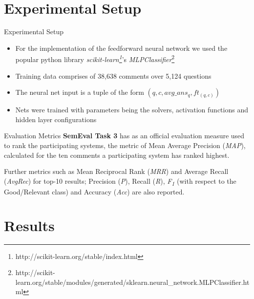 \documentclass[10pt]{beamer}
\begin{document}
\section{Experimental Setup}

\begin{frame}{Experimental Setup}
\begin{itemize}
\item For the implementation of the feedforward neural network we used the popular python library \textit{scikit-learn\footnote{http://scikit-learn.org/stable/index.html}}'s \textit{MLPClassifier}\footnote{http://scikit-learn.org/stable/modules/generated/sklearn.neural\_network.MLPClassifier.html}
\item Training data comprises of 38,638 comments over 5,124 questions
\item The neural net input is a tuple of the form $(q, c, avg\_ans_q, ft_{(q,c)})$
\item Nets were trained with parameters being the solvers, activation functions and hidden layer configurations
\end{itemize}
\end{frame}

\begin{frame}{Evaluation Metrics}
\justify
\textbf{SemEval Task 3} has as an official evaluation measure used to rank the participating systems, the metric of Mean Average Precision (\textit{MAP}), calculated for the ten comments a participating system has ranked highest. 

Further metrics such as Mean Reciprocal Rank (\textit{MRR}) and Average Recall (\textit{AvgRec}) for top-10 results; Precision (\textit{P}), Recall (\textit{R}), \textit{F\textsubscript{1}} (with respect to the Good/Relevant class) and Accuracy (\textit{Acc}) are also reported.
\end{frame}

\section{Results}
\end{document}
